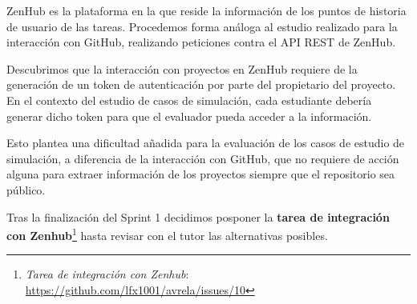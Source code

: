 ZenHub es la plataforma en la que reside la información de los puntos de historia de usuario de las tareas. Procedemos forma análoga al estudio realizado para la interacción con GitHub, realizando peticiones contra el API REST de ZenHub.

Descubrimos que la interacción con proyectos en ZenHub requiere de la generación de un token de autenticación por parte del propietario del proyecto. En el contexto del estudio de casos de simulación, cada estudiante debería generar dicho token para que el evaluador pueda acceder a la información.

Esto plantea una dificultad añadida para la evaluación de los casos de estudio de simulación, a diferencia de la interacción con GitHub, que no requiere de acción alguna para extraer información de los proyectos siempre que el repositorio sea público.

Tras la finalización del Sprint 1 decidimos posponer la \textbf {tarea de integración con Zenhub}\footnote{\textsl{Tarea de integración con Zenhub}: \url{https://github.com/lfx1001/avrela/issues/10}} hasta revisar con el tutor las alternativas posibles.